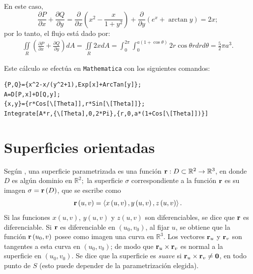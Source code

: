 \begin{ejemplo}
En este caso,
\[\frac{\partial P}{\partial x}+\frac{\partial Q}{\partial y}=\frac{\partial }{\partial x}\left( x^{2}-\frac{x}{1+y^{2}}\right) +\frac{\partial }{\partial y}\left( e^{x}+\arctan y\right) = 2x;\]
por lo tanto, el flujo está dado por:
\begin{gather*}
\iint\limits_{R}\left( \frac{\partial P}{\partial x}+\frac{\partial Q}{\partial y}\right) dA=\iint\limits_{R}2xdA=\int_{0}^{2\pi}\int_{0}^{a(1+\cos \theta )} 2r\cos \theta  rdrd\theta= \frac{5}{2}\pi a^{3}.
\end{gather*}

\end{ejemplo}
Este cálculo se efectúa en \verb"Mathematica" con los siguientes comandos:

\begin{tcolorbox}[title=\bf Instrucción \verb"Mathematica"]\begin{Verbatim}[formatcom=\letraverbatim]
{P,Q}={x^2-x/(y^2+1),Exp[x]+ArcTan[y]};
A=D[P,x]+D[Q,y];
{x,y}={r*Cos[\[Theta]],r*Sin[\[Theta]]};
Integrate[A*r,{\[Theta],0,2*Pi},{r,0,a*(1+Cos[\[Theta]])}]
\end{Verbatim}
\end{tcolorbox}

\section{Superficies orientadas}

Según \textcite{marsden_calculo_2013}, una superficie parametrizada es una función ${\bf r}:D\subset \mathbb{R}^{2}\rightarrow \mathbb{R}^{3}$, en donde $D$ es algún dominio en $\mathbb{R}^{2};$ la superficie $\sigma$ correspondiente a la función ${\bf r}$ es su imagen $\sigma ={\bf r}\left( D\right) $, que se escribe como
\[{\bf r}\left( u,v\right) =\left\langle x\left( u,v\right) ,y\left( u,v\right),z\left( u,v\right) \right\rangle.\]
Si las funciones $x(u,v) $, $y(u,v) $ y $z(u,v)$ son diferenciables, se dice que ${\bf r}$ es diferenciable. Si ${\bf r}$ es diferenciable en $\left( u_{0},v_{0}\right) $, al fijar $u$, se obtiene que la función ${\bf r}\left( u_{0},v\right) $ posee como imagen una curva en $\mathbb{R}^{3}$. Los vectores ${\bf r}_{u}$ y ${\bf r}_{v}$ son tangentes a esta curva en $\left(u_{0},v_{0}\right)$; de modo que ${\bf r}_{u}\times {\bf r}_{v}$ es normal a la superficie en $\left( u_{0},v_{0}\right)$. Se dice que la superficie es \emph{suave}  si ${\bf r}_{u}\times {\bf r}_{v}\neq {\bf 0}$, en todo punto de $S$ (esto puede depender de la parametrización elegida).

